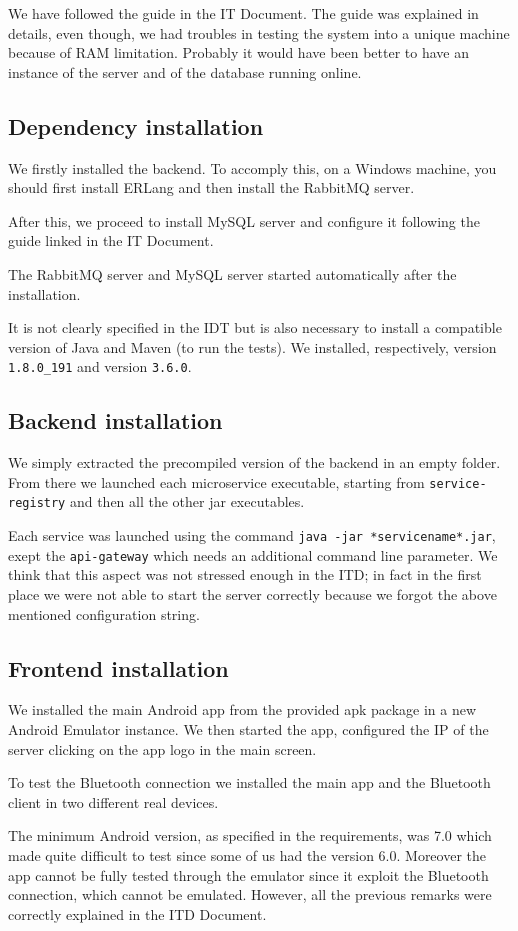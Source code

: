 We have followed the guide in the IT Document.
The guide was explained in details, even though, we had troubles in testing the system into a unique machine because of RAM limitation.
Probably it would have been better to have an instance of the server and of the database running online.


\subsection{Dependency installation}
We firstly installed the backend. To accomply this, on a Windows machine, you should first install ERLang and then install the RabbitMQ server.

After this, we proceed to install MySQL server and configure it following the guide linked in the IT Document.

The RabbitMQ server and MySQL server started automatically after the installation.

It is not clearly specified in the IDT but is also necessary to install a compatible version of Java and Maven (to run the tests). We installed, respectively, version \texttt{1.8.0\_191} and version \texttt{3.6.0}.

\subsection{Backend installation}
We simply extracted the precompiled version of the backend in an empty folder.
From there we launched each microservice executable, starting from \texttt{service-registry} and then all the other jar executables. 

Each service was launched using the command \texttt{java -jar *servicename*.jar}, exept the \texttt{api-gateway} which needs an additional command line parameter.
We think that this aspect was not stressed enough in the ITD; in fact in the first place we were not able to start the server correctly because we forgot the above mentioned configuration string.

\subsection{Frontend installation}
We installed the main Android app from the provided apk package in a new Android Emulator instance.
We then started the app, configured the IP of the server clicking on the app logo in the main screen.

To test the Bluetooth connection we installed the main app and the Bluetooth client in two different real devices.

The minimum Android version, as specified in the requirements, was 7.0 which made quite difficult to test since some of us had the version 6.0.
Moreover the app cannot be fully tested through the emulator since it exploit the Bluetooth connection, which cannot be emulated.
However, all the previous remarks were correctly explained in the ITD Document.




